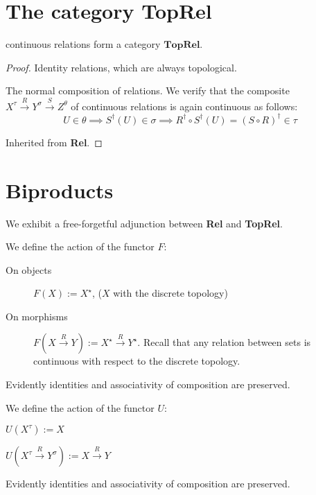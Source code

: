 \section{The category \textbf{TopRel}}

\begin{proposition}
continuous relations form a category $\mathbf{TopRel}$.
\begin{proof}
 Identity relations, which are always topological.

 The normal composition of relations. We verify that the composite $X^\tau \overset{R}{\rightarrow} Y^\sigma \overset{S}{\rightarrow} Z^\theta$ of continuous relations is again continuous as follows:
\[U \in \theta \implies S^\dag(U) \in \sigma \implies R^\dag \circ S^\dag(U) = (S \circ R)^\dag \in \tau\]

 Inherited from \textbf{Rel}.
\end{proof}
\end{proposition}

\section{Biproducts}

We exhibit a free-forgetful adjunction between \textbf{Rel} and \textbf{TopRel}.

\begin{defn} We define the action of the functor $F$:
\begin{description}
\item[On objects] $F(X) := X^\star$, ($X$ with the discrete topology)
\item[On morphisms] $F(X \overset{R}{\rightarrow} Y) := X^\star \overset{R}{\rightarrow} Y^\star$. Recall that any relation between sets is continuous with respect to the discrete topology.
\end{description}
Evidently identities and associativity of composition are preserved.
\end{defn}

\begin{defn}
\begin{description} We define the action of the functor $U$:
\item[On objects] $U(X^\tau) := X$
\item[On morphisms] $U(X^\tau \overset{R}{\rightarrow} Y^\sigma) := X \overset{R}{\rightarrow} Y$
\end{description}
Evidently identities and associativity of composition are preserved.
\end{defn}

